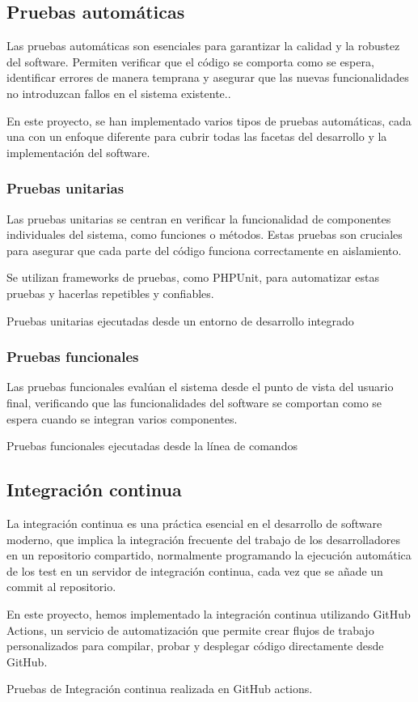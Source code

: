 \subsection*{Pruebas automáticas}
Las pruebas automáticas son esenciales para garantizar la calidad y la robustez del software. Permiten verificar que el
código se comporta como se espera, identificar errores de manera temprana y asegurar que las nuevas funcionalidades no
introduzcan fallos en el sistema existente..

En este proyecto, se han implementado varios tipos de pruebas automáticas, cada una con un enfoque diferente para cubrir
todas las facetas del desarrollo y la implementación del software.

\subsubsection*{Pruebas unitarias}
Las pruebas unitarias se centran en verificar la funcionalidad de componentes individuales del sistema, como funciones o
métodos. Estas pruebas son cruciales para asegurar que cada parte del código funciona correctamente en aislamiento.

Se utilizan frameworks de pruebas, como PHPUnit, para automatizar estas pruebas y hacerlas repetibles y confiables.


Pruebas unitarias ejecutadas desde un entorno de desarrollo integrado

\subsubsection*{Pruebas funcionales}
Las pruebas funcionales evalúan el sistema desde el punto de vista del usuario final, verificando que las
funcionalidades del software se comportan como se espera cuando se integran varios componentes.


Pruebas funcionales ejecutadas desde la línea de comandos

\subsection*{Integración continua}
La integración continua es una práctica esencial en el desarrollo de software moderno, que implica la integración
frecuente del trabajo de los desarrolladores en un repositorio compartido, normalmente programando la ejecución
automática de los test en un servidor de integración continua, cada vez que se añade un commit al repositorio.

En este proyecto, hemos implementado la integración continua utilizando GitHub Actions, un servicio de automatización
que permite crear flujos de trabajo personalizados para compilar, probar y desplegar código directamente desde GitHub.


Pruebas de Integración continua realizada en GitHub actions.